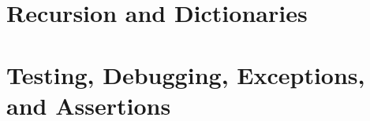 \documentclass[letterpaper,12pt]{article}
\begin{document}
\section{Recursion and Dictionaries}

\section{Testing, Debugging, Exceptions, and Assertions}
\end{document}
